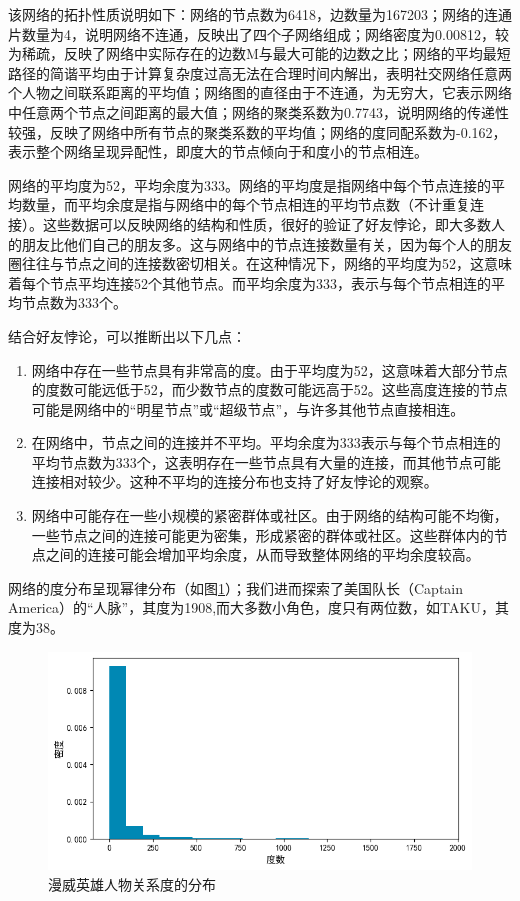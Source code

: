 \documentclass[12pt]{xjtureport}
\begin{document}
该网络的拓扑性质说明如下：网络的节点数为6418，边数量为167203；网络的连通片数量为4，说明网络不连通，反映出了四个子网络组成；网络密度为0.00812，较为稀疏，反映了网络中实际存在的边数M与最大可能的边数之比；网络的平均最短路径的简谐平均由于计算复杂度过高无法在合理时间内解出，表明社交网络任意两个人物之间联系距离的平均值；网络图的直径由于不连通，为无穷大，它表示网络中任意两个节点之间距离的最大值；网络的聚类系数为0.7743，说明网络的传递性较强，反映了网络中所有节点的聚类系数的平均值；网络的度同配系数为-0.162，表示整个网络呈现异配性，即度大的节点倾向于和度小的节点相连。

网络的平均度为52，平均余度为333。网络的平均度是指网络中每个节点连接的平均数量，而平均余度是指与网络中的每个节点相连的平均节点数（不计重复连接）。这些数据可以反映网络的结构和性质，很好的验证了好友悖论，即大多数人的朋友比他们自己的朋友多。这与网络中的节点连接数量有关，因为每个人的朋友圈往往与节点之间的连接数密切相关。在这种情况下，网络的平均度为52，这意味着每个节点平均连接52个其他节点。而平均余度为333，表示与每个节点相连的平均节点数为333个。

结合好友悖论，可以推断出以下几点：

\begin{enumerate}

    \item 网络中存在一些节点具有非常高的度。由于平均度为52，这意味着大部分节点的度数可能远低于52，而少数节点的度数可能远高于52。这些高度连接的节点可能是网络中的“明星节点”或“超级节点”，与许多其他节点直接相连。

    \item 在网络中，节点之间的连接并不平均。平均余度为333表示与每个节点相连的平均节点数为333个，这表明存在一些节点具有大量的连接，而其他节点可能连接相对较少。这种不平均的连接分布也支持了好友悖论的观察。

    \item 网络中可能存在一些小规模的紧密群体或社区。由于网络的结构可能不均衡，一些节点之间的连接可能更为密集，形成紧密的群体或社区。这些群体内的节点之间的连接可能会增加平均余度，从而导致整体网络的平均余度较高。

\end{enumerate}

网络的度分布呈现幂律分布（如图\ref{degrees}）；我们进而探索了美国队长（Captain America）的“人脉”，其度为1908,而大多数小角色，度只有两位数，如TAKU，其度为38。

\begin{figure}[!htbp]
    \centering
    \includegraphics[width=0.8\linewidth]{figures/漫威英雄人物关系度的分布.png}
    \caption{漫威英雄人物关系度的分布}
    \label{degrees}
\end{figure}
\end{document}
